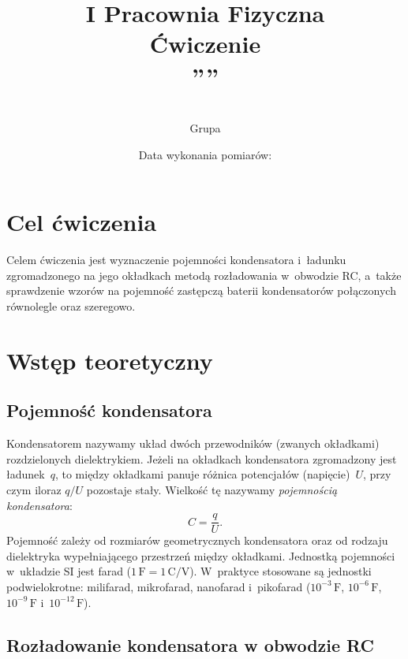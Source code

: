 \documentclass[12pt, a4paper]{article}
\title{
    \large I Pracownia Fizyczna \\[0.5em]
    \textbf{Ćwiczenie \nrCwiczenia} \\[0.3em]
    \LARGE \tytul\space''\codeword''
}
\author{
    \autor\\
     Grupa \nrGrupy}
\date{
    Data wykonania pomiarów: \dataWykonania\\
}
\begin{document}

\maketitle
\thispagestyle{empty}
\newpage

\section{Cel ćwiczenia}

Celem ćwiczenia jest wyznaczenie pojemności kondensatora i~ładunku zgromadzonego
na jego okładkach metodą rozładowania w~obwodzie RC, a~także sprawdzenie wzorów
na pojemność zastępczą baterii kondensatorów połączonych równolegle oraz szeregowo.

\section{Wstęp teoretyczny}

\subsection{Pojemność kondensatora}

Kondensatorem nazywamy układ dwóch przewodników (zwanych okładkami) rozdzielonych
dielektrykiem. Jeżeli na okładkach kondensatora zgromadzony jest ładunek~$q$, to
między okładkami panuje różnica potencjałów (napięcie)~$U$, przy czym iloraz $q/U$
pozostaje stały. Wielkość tę nazywamy \emph{pojemnością kondensatora}:
\begin{equation}
    C = \frac{q}{U}.
    \label{eq:pojemnosc}
\end{equation}
Pojemność zależy od rozmiarów geometrycznych kondensatora oraz od rodzaju
dielektryka wypełniającego przestrzeń między okładkami. Jednostką pojemności
w~układzie SI jest farad ($1\,\mathrm{F} = 1\,\mathrm{C/V}$). W~praktyce stosowane
są jednostki podwielokrotne: milifarad, mikrofarad, nanofarad i~pikofarad
($10^{-3}\,\mathrm{F}$, $10^{-6}\,\mathrm{F}$, $10^{-9}\,\mathrm{F}$
i~$10^{-12}\,\mathrm{F}$).

\subsection{Rozładowanie kondensatora w obwodzie RC}
\end{document}
